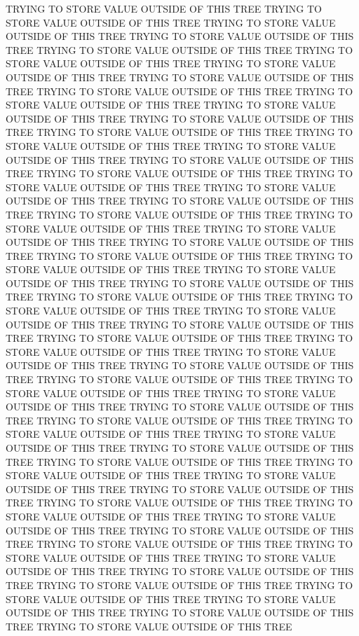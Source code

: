 TRYING TO STORE VALUE OUTSIDE OF THIS TREE
TRYING TO STORE VALUE OUTSIDE OF THIS TREE
TRYING TO STORE VALUE OUTSIDE OF THIS TREE
TRYING TO STORE VALUE OUTSIDE OF THIS TREE
TRYING TO STORE VALUE OUTSIDE OF THIS TREE
TRYING TO STORE VALUE OUTSIDE OF THIS TREE
TRYING TO STORE VALUE OUTSIDE OF THIS TREE
TRYING TO STORE VALUE OUTSIDE OF THIS TREE
TRYING TO STORE VALUE OUTSIDE OF THIS TREE
TRYING TO STORE VALUE OUTSIDE OF THIS TREE
TRYING TO STORE VALUE OUTSIDE OF THIS TREE
TRYING TO STORE VALUE OUTSIDE OF THIS TREE
TRYING TO STORE VALUE OUTSIDE OF THIS TREE
TRYING TO STORE VALUE OUTSIDE OF THIS TREE
TRYING TO STORE VALUE OUTSIDE OF THIS TREE
TRYING TO STORE VALUE OUTSIDE OF THIS TREE
TRYING TO STORE VALUE OUTSIDE OF THIS TREE
TRYING TO STORE VALUE OUTSIDE OF THIS TREE
TRYING TO STORE VALUE OUTSIDE OF THIS TREE
TRYING TO STORE VALUE OUTSIDE OF THIS TREE
TRYING TO STORE VALUE OUTSIDE OF THIS TREE
TRYING TO STORE VALUE OUTSIDE OF THIS TREE
TRYING TO STORE VALUE OUTSIDE OF THIS TREE
TRYING TO STORE VALUE OUTSIDE OF THIS TREE
TRYING TO STORE VALUE OUTSIDE OF THIS TREE
TRYING TO STORE VALUE OUTSIDE OF THIS TREE
TRYING TO STORE VALUE OUTSIDE OF THIS TREE
TRYING TO STORE VALUE OUTSIDE OF THIS TREE
TRYING TO STORE VALUE OUTSIDE OF THIS TREE
TRYING TO STORE VALUE OUTSIDE OF THIS TREE
TRYING TO STORE VALUE OUTSIDE OF THIS TREE
TRYING TO STORE VALUE OUTSIDE OF THIS TREE
TRYING TO STORE VALUE OUTSIDE OF THIS TREE
TRYING TO STORE VALUE OUTSIDE OF THIS TREE
TRYING TO STORE VALUE OUTSIDE OF THIS TREE
TRYING TO STORE VALUE OUTSIDE OF THIS TREE
TRYING TO STORE VALUE OUTSIDE OF THIS TREE
TRYING TO STORE VALUE OUTSIDE OF THIS TREE
TRYING TO STORE VALUE OUTSIDE OF THIS TREE
TRYING TO STORE VALUE OUTSIDE OF THIS TREE
TRYING TO STORE VALUE OUTSIDE OF THIS TREE
TRYING TO STORE VALUE OUTSIDE OF THIS TREE
TRYING TO STORE VALUE OUTSIDE OF THIS TREE
TRYING TO STORE VALUE OUTSIDE OF THIS TREE
TRYING TO STORE VALUE OUTSIDE OF THIS TREE
TRYING TO STORE VALUE OUTSIDE OF THIS TREE
TRYING TO STORE VALUE OUTSIDE OF THIS TREE
TRYING TO STORE VALUE OUTSIDE OF THIS TREE
TRYING TO STORE VALUE OUTSIDE OF THIS TREE
TRYING TO STORE VALUE OUTSIDE OF THIS TREE
TRYING TO STORE VALUE OUTSIDE OF THIS TREE
TRYING TO STORE VALUE OUTSIDE OF THIS TREE
TRYING TO STORE VALUE OUTSIDE OF THIS TREE
TRYING TO STORE VALUE OUTSIDE OF THIS TREE
TRYING TO STORE VALUE OUTSIDE OF THIS TREE
TRYING TO STORE VALUE OUTSIDE OF THIS TREE
TRYING TO STORE VALUE OUTSIDE OF THIS TREE
TRYING TO STORE VALUE OUTSIDE OF THIS TREE
TRYING TO STORE VALUE OUTSIDE OF THIS TREE
TRYING TO STORE VALUE OUTSIDE OF THIS TREE
TRYING TO STORE VALUE OUTSIDE OF THIS TREE
